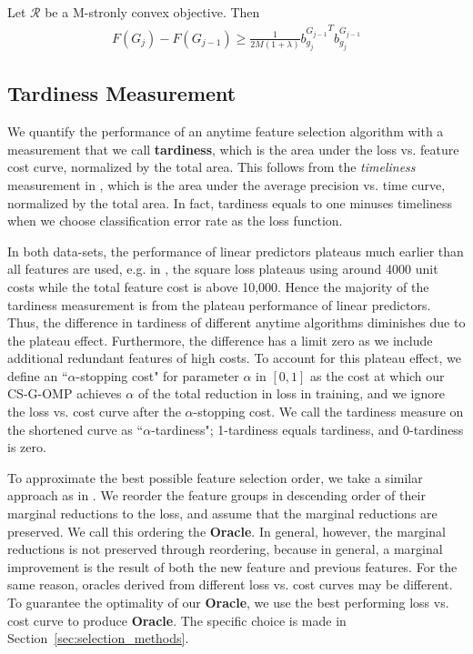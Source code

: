 

\begin{lemma}
  Let $\mathcal{R}$ be a M-stronly convex objective. Then
    \begin{align}
      F(G_j) - F(G_{j-1}) \geq \frac{1}{2M (1 + \lambda) } {b^{G_{j-1}}_{g_j}}^Tb^{G_{j-1}}_{g_j}
    \end{align}
  \label{lemma:convexity}
\end{lemma}



\subsection{Tardiness Measurement}
We quantify the performance of an anytime feature selection algorithm with 
a measurement that we call \textbf{tardiness}, which is the area
under the loss vs. feature cost curve, normalized by the total area. This follows from 
the \textit{timeliness} measurement in \cite{timeliness}, which is the area under the 
average precision vs. time curve, normalized by the total area. 
In fact, tardiness equals to one minuses timeliness when we choose classification 
error rate as the loss function. 

In both data-sets, the performance of linear predictors plateaus much earlier than
all features are used, e.g. in \YahooDataset, the square loss plateaus using around 4000 unit costs while the total feature cost is above 10,000. Hence the majority of the tardiness measurement is from the plateau performance of linear predictors.
Thus, the difference in tardiness of different anytime algorithms diminishes due to the plateau effect. Furthermore, the difference has a limit zero as we include additional redundant features of high costs. To account for this plateau effect, 
we define an ``$\alpha$-stopping cost" for parameter $\alpha$ in $[0,1]$ as the cost at which our CS-G-OMP achieves $\alpha$ of the total 
reduction in loss in training, and we ignore the loss vs. cost curve after
the $\alpha$-stopping cost. We call the tardiness measure on the shortened curve 
as ``$\alpha$-tardiness"; 1-tardiness equals tardiness, and 0-tardiness is zero. 

To approximate the best possible feature selection order, we take a similar approach as in \cite{timeliness}. We reorder the feature groups 
in descending order of their marginal reductions to the loss, and assume that 
the marginal reductions are preserved. We call this ordering the \textbf{Oracle}. In general, however,
the marginal reductions is not preserved through reordering, because 
in general, a marginal improvement is the result of both the new feature and previous features. For the same reason, oracles derived from different loss vs. cost curves 
may be different. To guarantee the optimality of our \textbf{Oracle}, we use 
the best performing loss vs. cost curve to produce \textbf{Oracle}. The specific choice is made in Section~\ref{sec:selection_methods}.


